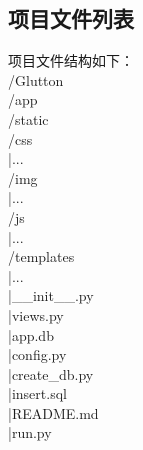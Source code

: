 \documentclass[12pt, oneside,a4paper]{article}
\begin{document}
\subsection{项目文件列表}
项目文件结构如下：\\
/Glutton \\
\hspace*{1cm}	/app \\
		\hspace*{1cm}\hspace*{1cm}/static \\
		\hspace*{1cm}\hspace*{1cm}\hspace*{1cm}	/css \\
		\hspace*{1cm}\hspace*{1cm}\hspace*{1cm}\hspace*{1cm}		|... \\
		\hspace*{1cm}\hspace*{1cm}\hspace*{1cm}	/img \\
		\hspace*{1cm}\hspace*{1cm}\hspace*{1cm}\hspace*{1cm}		|... \\
		\hspace*{1cm}\hspace*{1cm}\hspace*{1cm}	/js \\
		\hspace*{1cm}\hspace*{1cm}\hspace*{1cm}\hspace*{1cm}		|... \\
		\hspace*{1cm}\hspace*{1cm}/templates \\
		\hspace*{1cm}\hspace*{1cm}\hspace*{1cm}	|... \\
		\hspace*{1cm}\hspace*{1cm}|\_\_init\_\_.py \\
		\hspace*{1cm}\hspace*{1cm}|views.py \\
	\hspace*{1cm}|app.db \\
	\hspace*{1cm}|config.py \\
	\hspace*{1cm}|create\_db.py \\
	\hspace*{1cm}|insert.sql \\
	\hspace*{1cm}|README.md \\
	\hspace*{1cm}|run.py
\end{document}
